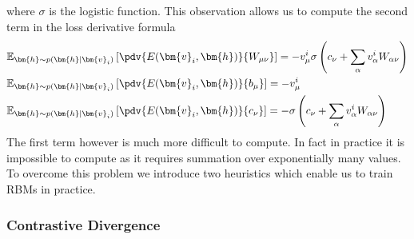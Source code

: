 \documentclass[a5paper]{article}
\begin{document}
where \(\sigma\) is the logistic function. This observation allows us to compute the second term in
the loss derivative formula
\[
\begin{split}
&\mathbb{E}_{\bm{h} \sim p(\bm{h} \mid \bm{v}_i)}\left[ \pdv{E(\bm{v}_i, \bm{h})}{W_{\mu\nu}}\right] = -v_\mu^i \sigma\left(c_\nu + \sum_\alpha v_\alpha^i W_{\alpha\nu}\right)\\
&\mathbb{E}_{\bm{h} \sim p(\bm{h} \mid \bm{v}_i)}\left[ \pdv{E(\bm{v}_i, \bm{h})}{b_{\mu}}\right] = -v_\mu^i\\
&\mathbb{E}_{\bm{h} \sim p(\bm{h} \mid \bm{v}_i)}\left[ \pdv{E(\bm{v}_i, \bm{h})}{c_\nu}\right] = - \sigma\left(c_\nu + \sum_\alpha v_\alpha^i W_{\alpha\nu}\right)
\end{split}
\]
The first term however is much more difficult to compute. In fact in practice it is impossible to
compute as it requires summation over exponentially many values. To overcome this problem we
introduce two heuristics which enable us to train RBMs in practice.


\subsubsection{Contrastive Divergence}
\end{document}

